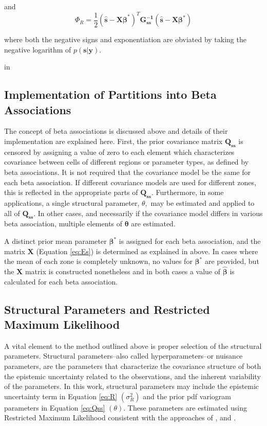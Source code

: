\documentclass[11pt,oneside,onecolumn]{usgsreport}
\begin{document}
\begin{appendix}
and
\[
\Phi_{R}=\frac{1}{2}(\mathbf{\hat{s}-X\beta}^{*})^{T}\mathbf{G_{\mathbf{ss}}^{-1}}(\mathbf{\hat{s}-X\beta^{*}})
\]


where both the negative signs and exponentiation are obviated by taking
the negative logarithm of $p\left(\mathbf{s}|\mathbf{y}\right)$.

 in
\subsection{Implementation of Partitions into Beta Associations}

The concept of beta associations is discussed above and details of
their implementation are explained here. First, the prior covariance
matrix $\mathbf{Q_{ss}}$ is censored by assigning a value of zero
to each element which characterizes covariance between cells of different
regions or parameter types, as defined by beta associations. It is
not required that the covariance model be the same for each beta association.
If different covariance models are used for different zones, this
is reflected in the appropriate parts of $\mathbf{Q_{ss}}.$ Furthermore,
in some applications, a single structural parameter, $\theta,$ may
be estimated and applied to all of $\mathbf{Q_{ss}.}$ In other cases,
and necessarily if the covariance model differs in various beta association,
multiple elements of $\mathbf{\theta}$ are estimated.

A distinct prior mean parameter $\mathbf{\beta^{*}}$ is assigned
for each beta association, and the matrix $\mathbf{X}$ (Equation
\ref{eq:Es}) is determined as explained in above. In cases where
the mean of each zone is completely unknown, no values for $\mathbf{\beta^{*}}$
are provided, but the $\mathbf{X}$ matrix is constructed nonetheless
and in both cases a value of $\mathbf{\hat{\beta}}$ is calculated
for each beta association.


\subsection{\label{sub:Structural-Parameters}Structural Parameters and Restricted
Maximum Likelihood}

A vital element to the method outlined above is proper selection of
the structural parameters. Structural parameters--also called hyperparameters--or
nuisance parameters, are the parameters that characterize the covariance
structure of both the epistemic uncertainty related to the observations,
and the inherent variability of the parameters. In this work, structural
parameters may include the epistemic uncertainty term in Equation
\ref{eq:R} $\left(\sigma_{R}^{2}\right)$ and the prior pdf variogram
parameters in Equation \ref{eq:Qss} $\left(\theta\right).$ These
parameters are estimated using Restricted Maximum Likelihood consistent
with the approaches of \citet{KitanidisVomvoris1983}, \citet{Kitanidis1995}
and \citet{LiCirpka2007}.


\end{appendix}
\end{document}
